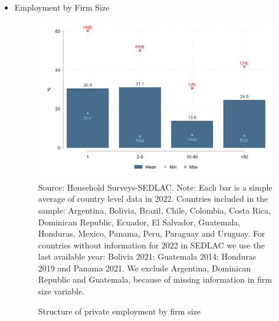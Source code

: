 \documentclass[english]{article}
\begin{document}
\begin{itemize}
        
\item Employment by Firm Size
\begin{figure}[!htb]
        \justifying
        \caption{Structure of private employment by firm size}     
        \includegraphics[scale=.3]{latex/figures/Snapshot/Structure of employment by firm size.png}
        \label{fig:firmsize}
        \footnotesize{Source: Household Surveys-SEDLAC.}
        \footnotesize{Note: Each bar is a simple average of country level data in 2022. Countries included in the sample: Argentina, Bolivia, Brazil, Chile, Colombia, Costa Rica, Dominican Republic, Ecuador, El Salvador, Guatemala, Honduras, Mexico, Panama, Peru, Paraguay and Uruguay. For countries without information for 2022 in SEDLAC we use the last available year: Bolivia 2021; Guatemala 2014; Honduras 2019 and Panama 2021. We exclude Argentina, Dominican Republic and Guatemala, because of missing information in firm size variable.}
        \end{figure}



\end{itemize}
\end{document}
